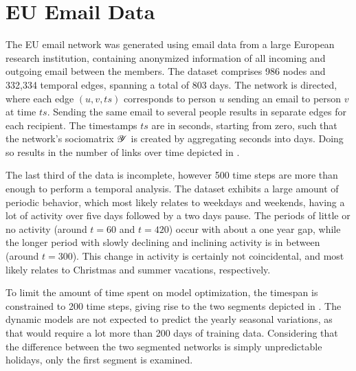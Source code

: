\section{EU Email Data}

The EU email network was generated using email data from a large European research institution, containing anonymized information of all incoming and outgoing email between the members. The dataset comprises 986 nodes and 332,334 temporal edges, spanning a total of 803 days. The network is directed, where each edge $(u,v,ts)$ corresponds to person $u$ sending an email to person $v$ at time $ts$. Sending the same email to several people results in separate edges for each recipient. The timestamps $ts$ are in seconds, starting from zero, such that the network's sociomatrix $\bm{\mathscr{Y}}$ is created by aggregating seconds into days. Doing so results in the number of links over time depicted in .


The last third of the data is incomplete, however 500 time steps are more than enough to perform a temporal analysis. 
The dataset exhibits a large amount of periodic behavior, which most likely relates to weekdays and weekends, having a lot of activity over five days followed by a two days pause. The periods of little or no activity (around $t=60$ and $t=420$) occur with about a one year gap, while the longer period with slowly declining and inclining activity is in between (around $t=300$). This change in activity is certainly not coincidental, and most likely relates to Christmas and summer vacations, respectively.

To limit the amount of time spent on model optimization, the timespan is constrained to 200 time steps, giving rise to the two segments depicted in .
\xfig{\xdouble
    {\ximg{Data/EUEmail/Links0-200}[Links for {$t=[0,200)$}]}
    {\ximg{Data/EUEmail/Links200-400}[Links for {$t=[200,400)$}]}
}
The dynamic models are not expected to predict the yearly seasonal variations, as that would require a lot more than 200 days of training data. Considering that the difference between the two segmented networks is simply unpredictable holidays, only the first segment is examined.